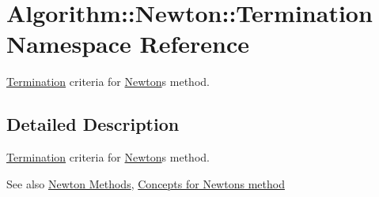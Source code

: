\hypertarget{namespaceAlgorithm_1_1Newton_1_1Termination}{}\section{Algorithm\+:\+:Newton\+:\+:Termination Namespace Reference}
\label{namespaceAlgorithm_1_1Newton_1_1Termination}


\hyperlink{namespaceAlgorithm_1_1Newton_1_1Termination}{Termination} criteria for \hyperlink{namespaceAlgorithm_1_1Newton}{Newton}\textquotesingle{}s method.  




\subsection{Detailed Description}
\hyperlink{namespaceAlgorithm_1_1Newton_1_1Termination}{Termination} criteria for \hyperlink{namespaceAlgorithm_1_1Newton}{Newton}\textquotesingle{}s method. 

\begin{DoxySeeAlso}{See also}
\hyperlink{group__NewtonGroup}{Newton Methods}, \hyperlink{group__NewtonConceptGroup}{Concepts for Newton\textquotesingle{}s method} 
\end{DoxySeeAlso}
